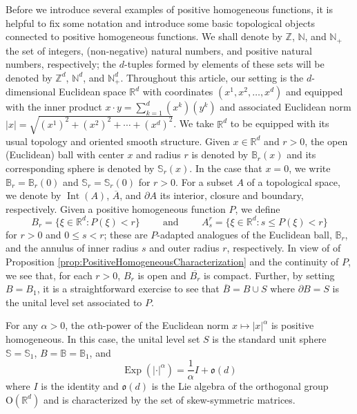 \documentclass[smallextended]{svjour3}
\theoremstyle{remark}
\newcommand\OdR{\mbox{O}(\mathbb{R}^d)} %
\newcommand\Exp{\operatorname{Exp}}
\newcommand\Interior{\operatorname{Int}}
\begin{document}
\noindent Before we introduce several examples of positive homogeneous functions, it is helpful to fix some notation and introduce some basic topological objects connected to positive homogeneous functions. We shall denote by $\mathbb{Z}$, $\mathbb{N}$, and $\mathbb{N}_+$ the set of integers, (non-negative) natural numbers, and positive natural numbers, respectively; the $d$-tuples formed by elements of these sets will be denoted by $\mathbb{Z}^d$, $\mathbb{N}^d$, and $\mathbb{N}_+^d$. Throughout this article, our setting is the $d$-dimensional Euclidean space $\mathbb{R}^d$ with coordinates $(x^1,x^2,\dots,x^d)$ and equipped with the inner product $x\cdot y=\sum_{k=1}^d(x^k)(y^k)$ and associated Euclidean norm $|x|=\sqrt{(x^1)^2+(x^2)^2+\cdots+(x^d)^2}$. We take $\mathbb{R}^d$ to be equipped with its usual topology and oriented smooth structure. Given $x\in\mathbb{R}^d$ and $r>0$, the open (Euclidean) ball with center $x$ and radius $r$ is denoted by $\mathbb{B}_r(x)$ and its corresponding sphere is denoted by $\mathbb{S}_r(x)$. In the case that $x=0$, we write $\mathbb{B}_r=\mathbb{B}_r(0)$ and $\mathbb{S}_r=\mathbb{S}_r(0)$ for $r>0$. For a subset $A$ of a topological space, we denote by $\Interior{(A)}$, $\overline{A}$, and $\partial A$ its interior, closure and boundary, respectively. Given a positive homogeneous function $P$, we define
\begin{equation*}
B_r=\{\xi\in\mathbb{R}^d:P(\xi)<r\}\hspace{1cm}\mbox{and}\hspace{1cm}A_s^r=\{\xi\in\mathbb{R}^d:s\leq P(\xi)<r\}
\end{equation*}
for $r>0$ and $0\leq s<r$; these are $P$-adapted analogues of the Euclidean ball, $\mathbb{B}_r$, and the annulus of inner radius $s$ and outer radius $r$, respectively. In view of of Proposition \ref{prop:PositiveHomogeneousCharacterization} and the continuity of $P$, we see that, for each $r>0$, $B_r$ is open and $\overline{B_r}$ is compact. Further, by setting $B=B_1$, it is a straightforward exercise to see that $\overline{B}=B\cup S$ where $\partial B=S$ is the unital level set associated to $P$.





\begin{example}\label{exp:EuclideanNorm}\normalfont
For any $\alpha>0$, the $\alpha$th-power of the Euclidean norm $x\mapsto |x|^\alpha$ is positive homogeneous.  In this case, the unital level set $S$ is the standard unit sphere $\mathbb{S}=\mathbb{S}_1$, $B=\mathbb{B}=\mathbb{B}_1$, and
\begin{equation*}
    \Exp(|\cdot|^\alpha)=\frac{1}{\alpha}I+\mathfrak{o}(d)
\end{equation*}
where $I$ is the identity and $\mathfrak{o}(d)$ is the Lie algebra of the orthogonal group $\OdR$ and is characterized by the set of skew-symmetric matrices. 
\end{example}
\end{document}
